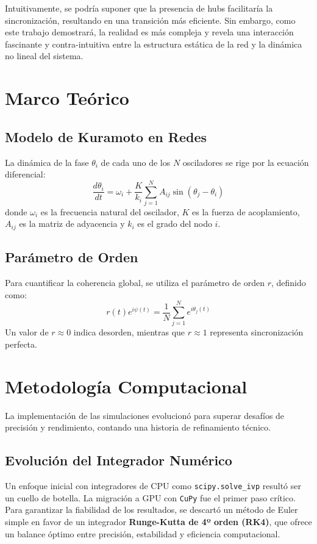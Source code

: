 \documentclass[12pt, a4paper]{article}
\begin{document}
Intuitivamente, se podría suponer que la presencia de hubs facilitaría la sincronización, resultando en una transición más eficiente. Sin embargo, como este trabajo demostrará, la realidad es más compleja y revela una interacción fascinante y contra-intuitiva entre la estructura estática de la red y la dinámica no lineal del sistema.

\section{Marco Teórico}

\subsection{Modelo de Kuramoto en Redes}
La dinámica de la fase \(\theta_i\) de cada uno de los \(N\) osciladores se rige por la ecuación diferencial:
\begin{equation}
\frac{d\theta_i}{dt} = \omega_i + \frac{K}{k_i} \sum_{j=1}^{N} A_{ij} \sin(\theta_j - \theta_i)
\label{eq:kuramoto}
\end{equation}
donde \(\omega_i\) es la frecuencia natural del oscilador, \(K\) es la fuerza de acoplamiento, \(A_{ij}\) es la matriz de adyacencia y \(k_i\) es el grado del nodo \(i\).

\subsection{Parámetro de Orden}
Para cuantificar la coherencia global, se utiliza el parámetro de orden \(r\), definido como:
\begin{equation}
r(t) e^{i\psi(t)} = \frac{1}{N} \sum_{j=1}^{N} e^{i\theta_j(t)}
\end{equation}
Un valor de \(r \approx 0\) indica desorden, mientras que \(r \approx 1\) representa sincronización perfecta.

\section{Metodología Computacional}
La implementación de las simulaciones evolucionó para superar desafíos de precisión y rendimiento, contando una historia de refinamiento técnico.

\subsection{Evolución del Integrador Numérico}
Un enfoque inicial con integradores de CPU como \texttt{scipy.solve\_ivp} resultó ser un cuello de botella. La migración a GPU con \texttt{CuPy} fue el primer paso crítico. Para garantizar la fiabilidad de los resultados, se descartó un método de Euler simple en favor de un integrador \textbf{Runge-Kutta de 4º orden (RK4)}, que ofrece un balance óptimo entre precisión, estabilidad y eficiencia computacional.
\end{document}
